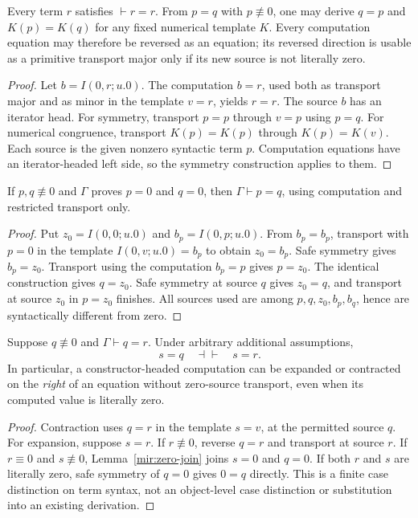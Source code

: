\begin{lemma}\label{mir:safe-equality}
Every term $r$ satisfies $\vdash r=r$. From $p=q$ with $p\not\equiv0$,
one may derive $q=p$ and $K(p)=K(q)$ for any fixed numerical template
$K$. Every computation equation may therefore be reversed as an
equation; its reversed direction is usable as a primitive transport
major only if its new source is not literally zero.
\end{lemma}
\begin{proof}
Let $b=I(0,r;u.0)$. The computation $b=r$, used both as transport
major and as minor in the template $v=r$, yields $r=r$. The source
$b$ has an iterator head. For symmetry, transport $p=p$ through
$v=p$ using $p=q$. For numerical congruence, transport
$K(p)=K(p)$ through $K(p)=K(v)$. Each source is the given nonzero
syntactic term $p$. Computation equations have an iterator-headed
left side, so the symmetry construction applies to them.
\end{proof}

\begin{lemma}\label{mir:zero-join}
If $p,q\not\equiv0$ and $\Gamma$ proves $p=0$ and $q=0$, then
$\Gamma\vdash p=q$, using computation and restricted transport only.
\end{lemma}
\begin{proof}
Put $z_0=I(0,0;u.0)$ and $b_p=I(0,p;u.0)$. From $b_p=b_p$,
transport with $p=0$ in the template $I(0,v;u.0)=b_p$ to obtain
$z_0=b_p$. Safe symmetry gives $b_p=z_0$. Transport using the
computation $b_p=p$ gives $p=z_0$. The identical construction gives
$q=z_0$. Safe symmetry at source $q$ gives $z_0=q$, and transport
at source $z_0$ in $p=z_0$ finishes. All sources used are among
$p,q,z_0,b_p,b_q$, hence are syntactically different from zero.
\end{proof}

\begin{lemma}\label{mir:right-expansion}
Suppose $q\not\equiv0$ and $\Gamma\vdash q=r$. Under arbitrary
additional assumptions,
\[
                 s=q\quad\dashv\vdash\quad s=r.
\]
In particular, a constructor-headed computation can be expanded or
contracted on the \emph{right} of an equation without zero-source
transport, even when its computed value is literally zero.
\end{lemma}
\begin{proof}
Contraction uses $q=r$ in the template $s=v$, at the permitted source
$q$. For expansion, suppose $s=r$. If $r\not\equiv0$, reverse $q=r$
and transport at source $r$. If $r\equiv0$ and $s\not\equiv0$,
Lemma~\ref{mir:zero-join} joins $s=0$ and $q=0$. If both $r$ and $s$
are literally zero, safe symmetry of $q=0$ gives $0=q$ directly.
This is a finite case distinction on term syntax, not an object-level
case distinction or substitution into an existing derivation.
\end{proof}

